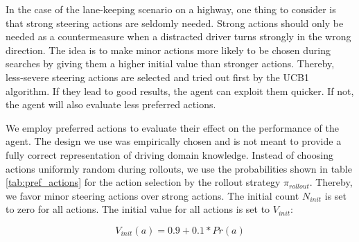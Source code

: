 In the case of the lane-keeping scenario on a highway, one thing to consider is that strong steering actions are seldomly needed. Strong actions should only be needed as a countermeasure when a distracted driver turns strongly in the wrong direction. The idea is to make minor actions more likely to be chosen during searches by giving them a higher initial value than stronger actions. Thereby, less-severe steering actions are selected and tried out first by the UCB1 algorithm. If they lead to good results, the agent can exploit them quicker. If not, the agent will also evaluate less preferred actions. 

We employ preferred actions to evaluate their effect on the performance of the agent. The design we use was empirically chosen and is not meant to provide a fully correct representation of driving domain knowledge. Instead of choosing actions uniformly random during rollouts, we use the probabilities shown in table \ref{tab:pref_actions} for the action selection by the rollout strategy $\pi_{rollout}$. Thereby, we favor minor steering actions over strong actions. The initial count $N_{init}$ is set to zero for all actions. The initial value for all actions is set to  $V_{init}$:

$$V_{init}(a) = 0.9 + 0.1 * Pr(a)$$


